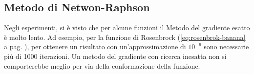 %
%
%

\subsection{Metodo di Netwon-Raphson} Negli esperimenti, si \`e visto
che per alcune funzioni il Metodo del gradiente esatto \`e molto
lento. Ad esempio, per la funzione di Rosenbrock
(\ref{eq:rosenbrok-banana} a pag. \pageref{eq:rosenbrok-banana}), per
ottenere un risultato con un'approssimazione di $10^{-6}$ sono
necessarie pi\`u di 1000 iterazioni. Un metodo del gradiente con ricerca
inesatta non si comporterebbe meglio per via della conformazione della
funzione.

